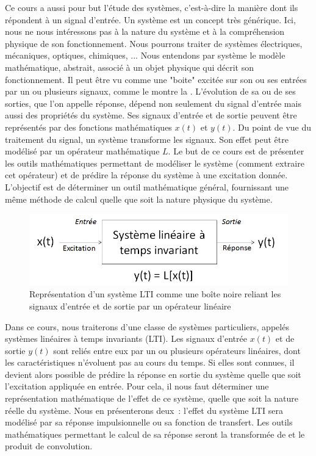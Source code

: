 	Ce cours a aussi pour but l'étude des systèmes, c'est-à-dire la manière dont ils répondent à un signal d'entrée. Un système est un concept très générique. Ici, nous ne nous intéressons pas à la nature du système et à la compréhension physique de son fonctionnement. Nous pourrons traiter de systèmes électriques, mécaniques, optiques, chimiques, ...	Nous entendons par système le modèle mathématique, abstrait, associé à un objet physique qui décrit son fonctionnement. Il peut être vu comme une "boite" excitée sur son ou ses entrées par un ou plusieurs signaux, comme le montre la . L'évolution de sa ou de ses sorties, que l'on appelle réponse, dépend non seulement du signal d'entrée mais aussi des propriétés du système. Ses signaux d'entrée et de sortie peuvent être représentés par des fonctions mathématiques $x(t)$ et $y(t)$. Du point de vue du traitement du signal, un système transforme les signaux. Son effet peut être modélisé par un opérateur mathématique $L$. Le but de ce cours est de présenter les outils mathématiques permettant de modéliser le système (comment extraire cet opérateur) et de prédire la réponse du système à une excitation donnée. L'objectif est de déterminer un outil mathématique général, fournissant une même méthode de calcul quelle que soit la nature physique du système.
	
	\begin{figure}[h!]
		\centering
		\includegraphics[scale=0.45]{images/LTI.jpg} 
		\caption{Représentation d'un système LTI comme une boîte noire reliant les signaux d'entrée et de sortie par un opérateur linéaire}	
		\label{Fig:LTI}
	\end{figure}


	Dans ce cours, nous traiterons d'une classe de systèmes particuliers, appelés systèmes linéaires à temps invariants (LTI). Les signaux d'entrée $x(t)$ et de sortie $y(t)$ sont reliés entre eux par un ou plusieurs opérateurs linéaires, dont les caractéristiques n'évoluent pas au cours du temps. Si elles sont connues, il devient alors possible de prédire la réponse en sortie du système quelle que soit l'excitation appliquée en entrée. Pour cela, il nous faut déterminer une représentation mathématique de l'effet de ce système, quelle que soit la nature réelle du système. Nous en présenterons deux~: l'effet du système LTI sera modélisé par sa réponse impulsionnelle ou sa fonction de transfert. Les outils mathématiques permettant le calcul de sa réponse seront la transformée de \Laplace{} et le produit de convolution.
	
